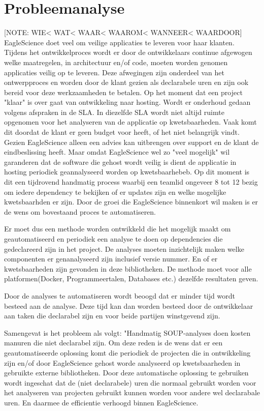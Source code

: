 \section{Probleemanalyse}\label{sec:probleemanalyse}
[NOTE: WIE< WAT< WAAR< WAAROM< WANNEER< WAARDOOR]
EagleScience doet veel om veilige applicaties te leveren voor haar klanten. Tijdens het ontwikkelproces wordt er door de ontwikkelaars continue afgewogen welke maatregelen, in architectuur en/of code, moeten worden genomen applicaties veilig op te leveren. Deze afwegingen zijn onderdeel van het ontwerpproces en worden door de klant gezien als declarabele uren en zijn ook bereid voor deze werkzaamheden te betalen. Op het moment dat een project "klaar" is over gaat van ontwikkeling naar hosting. Wordt er onderhoud gedaan volgens afspraken in de SLA. In diezelfde SLA wordt niet altijd ruimte opgenomen voor het analyseren van de applicatie op kwetsbaarheden. Vaak komt dit doordat de klant er geen budget voor heeft, of het niet belangrijk vindt. Gezien EagleScience alleen een advies kan uitbrengen over support en de klant de eindbeslissing heeft. Maar omdat EagleScience wel zo "veel mogelijk" wil garanderen dat de software die gehost wordt veilig is dient de applicatie in hosting periodiek geannalyseerd worden op kwetsbaarhebeb. Op dit moment is dit een tijdrovend handmatig process waarbij een teamlid ongeveer 8 tot 12 bezig om iedere dependency te bekijken of er updates zijn en welke mogelijke kwetsbaarhden er zijn. Door de groei die EagleScience binnenkort wil maken is er de wens om bovestaand proces te automatiseren.

Er moet dus een methode worden ontwikkeld die het mogelijk maakt om geautomatiseerd en periodiek een analyse te doen op dependencies die gedeclareerd zijn in het project. De analyses moeten inzichtelijk maken welke componenten er genanalyseerd zijn inclusief versie nummer. En of er kwetsbaarheden zijn gevonden in deze bibliotheken. De methode moet voor alle platformen(Docker, Programmeertalen, Databases etc.) dezelfde resultaten geven.

Door de analyses te automatiseren wordt beoogd dat er minder tijd wordt besteed aan de analyse. Deze tijd kan dan worden besteed door de ontwikkelaar aan taken die declarabel zijn en voor beide partijen winstgevend zijn.

Samengevat is het probleem als volgt: "Handmatig SOUP-analyses doen kosten manuren die niet declarabel zijn. Om deze reden is de wens dat er een geautomatiseerde oplossing komt die periodiek de projecten die in ontwikkeling zijn en/of door EagleScience gehost worde analyseerd op kwetsbaarheden in gebruikte externe bibliotheken. Door deze automatische oplossing te gebruiken wordt ingeschat dat de (niet declarabele) uren die normaal gebruikt worden voor het analyseren van projecten gebruikt kunnen worden voor andere wel declarabale uren. En daarmee de efficientie verhoogd binnen EagleScience.

